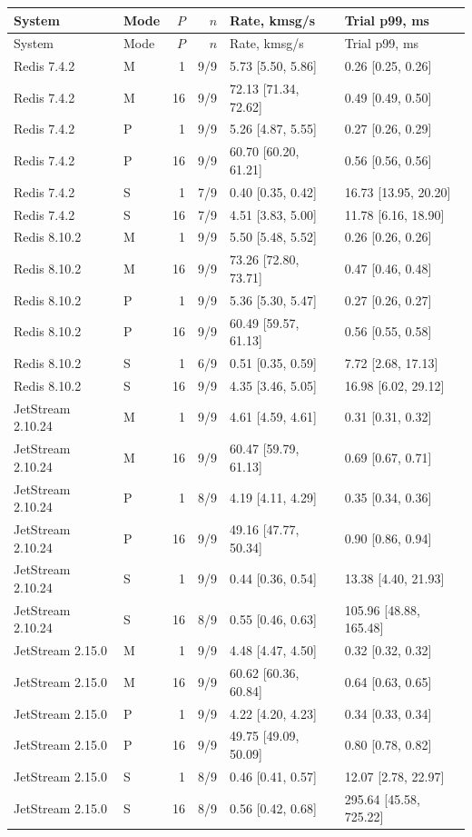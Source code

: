 \begin{longtable}{llrrll}
\toprule
System & Mode & $P$ & $n$ & Rate, kmsg/s & Trial p99, ms\\
\midrule
\endfirsthead
\toprule
System & Mode & $P$ & $n$ & Rate, kmsg/s & Trial p99, ms\\
\midrule
\endhead
Redis 7.4.2 & M & 1 & 9/9 & 5.73 [5.50, 5.86] & 0.26 [0.25, 0.26]\\
Redis 7.4.2 & M & 16 & 9/9 & 72.13 [71.34, 72.62] & 0.49 [0.49, 0.50]\\
Redis 7.4.2 & P & 1 & 9/9 & 5.26 [4.87, 5.55] & 0.27 [0.26, 0.29]\\
Redis 7.4.2 & P & 16 & 9/9 & 60.70 [60.20, 61.21] & 0.56 [0.56, 0.56]\\
Redis 7.4.2 & S & 1 & 7/9 & 0.40 [0.35, 0.42] & 16.73 [13.95, 20.20]\\
Redis 7.4.2 & S & 16 & 7/9 & 4.51 [3.83, 5.00] & 11.78 [6.16, 18.90]\\
Redis 8.10.2 & M & 1 & 9/9 & 5.50 [5.48, 5.52] & 0.26 [0.26, 0.26]\\
Redis 8.10.2 & M & 16 & 9/9 & 73.26 [72.80, 73.71] & 0.47 [0.46, 0.48]\\
Redis 8.10.2 & P & 1 & 9/9 & 5.36 [5.30, 5.47] & 0.27 [0.26, 0.27]\\
Redis 8.10.2 & P & 16 & 9/9 & 60.49 [59.57, 61.13] & 0.56 [0.55, 0.58]\\
Redis 8.10.2 & S & 1 & 6/9 & 0.51 [0.35, 0.59] & 7.72 [2.68, 17.13]\\
Redis 8.10.2 & S & 16 & 9/9 & 4.35 [3.46, 5.05] & 16.98 [6.02, 29.12]\\
JetStream 2.10.24 & M & 1 & 9/9 & 4.61 [4.59, 4.61] & 0.31 [0.31, 0.32]\\
JetStream 2.10.24 & M & 16 & 9/9 & 60.47 [59.79, 61.13] & 0.69 [0.67, 0.71]\\
JetStream 2.10.24 & P & 1 & 8/9 & 4.19 [4.11, 4.29] & 0.35 [0.34, 0.36]\\
JetStream 2.10.24 & P & 16 & 9/9 & 49.16 [47.77, 50.34] & 0.90 [0.86, 0.94]\\
JetStream 2.10.24 & S & 1 & 9/9 & 0.44 [0.36, 0.54] & 13.38 [4.40, 21.93]\\
JetStream 2.10.24 & S & 16 & 8/9 & 0.55 [0.46, 0.63] & 105.96 [48.88, 165.48]\\
JetStream 2.15.0 & M & 1 & 9/9 & 4.48 [4.47, 4.50] & 0.32 [0.32, 0.32]\\
JetStream 2.15.0 & M & 16 & 9/9 & 60.62 [60.36, 60.84] & 0.64 [0.63, 0.65]\\
JetStream 2.15.0 & P & 1 & 9/9 & 4.22 [4.20, 4.23] & 0.34 [0.33, 0.34]\\
JetStream 2.15.0 & P & 16 & 9/9 & 49.75 [49.09, 50.09] & 0.80 [0.78, 0.82]\\
JetStream 2.15.0 & S & 1 & 8/9 & 0.46 [0.41, 0.57] & 12.07 [2.78, 22.97]\\
JetStream 2.15.0 & S & 16 & 8/9 & 0.56 [0.42, 0.68] & 295.64 [45.58, 725.22]\\
\bottomrule
\end{longtable}

